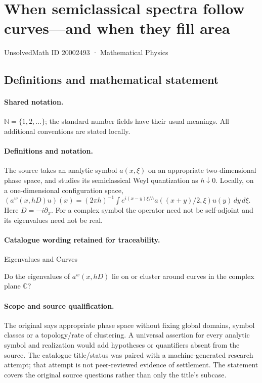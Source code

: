 \documentclass[11pt]{article}
\begin{document}
\setcounter{section}{20002492}
\section{When semiclassical spectra follow curves—and when they fill area}\label{20002493}
{\small UnsolvedMath ID 20002493 · Mathematical Physics}
\subsection{Definitions and mathematical statement}

\paragraph{Shared notation.}$\mathbb N=\{1,2,\ldots\}$; the standard number fields have their usual meanings. All additional conventions are stated locally.


\paragraph{Definitions and notation.}The source takes an analytic symbol $a(x,\xi)$ on an appropriate two-dimensional phase space, and studies its semiclassical Weyl quantization as $h\downarrow0$. Locally, on a one-dimensional configuration space, $(a^w(x,hD)u)(x)=(2\pi h)^{-1}\int e^{i(x-y)\xi/h}a((x+y)/2,\xi)u(y)\,dy\,d\xi$. Here $D=-i\partial_x$. For a complex symbol the operator need not be self-adjoint and its eigenvalues need not be real.

\paragraph{Catalogue wording retained for traceability.}
Eigenvalues and Curves

Do the eigenvalues of $a^w(x,hD)$ lie on or cluster around curves in the complex plane $\mathbb{C}$?
\paragraph{Scope and source qualification.}The original says appropriate phase space without fixing global domains, symbol classes or a topology/rate of clustering. A universal assertion for every analytic symbol and realization would add hypotheses or quantifiers absent from the source. The catalogue title/status was paired with a machine-generated research attempt; that attempt is not peer-reviewed evidence of settlement. The statement covers the original source questions rather than only the title’s subcase.
\end{document}
